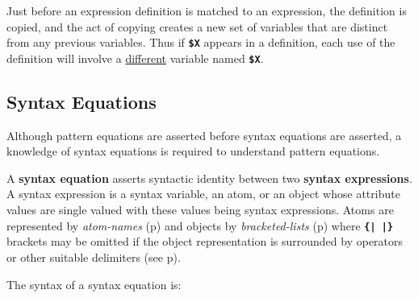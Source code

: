 \documentclass[12pt]{article}
\newcommand{\TT}[1]{{\tt \bfseries #1}}
\newcommand{\key}[1]{{\rm \bfseries #1}}
\newcommand{\pagref}[1]{p\pageref{#1}}
\begin{document}
Just before an expression definition is matched to an expression, the
definition is copied, and the act of copying 
creates a new set of variables that are distinct from any
previous variables.  Thus if \TT{\$X} appears in a definition, each
use of the definition will involve a \underline{different}
variable named \TT{\$X}.

\subsection{Syntax Equations}
\label{SYNTAX-EQUATIONS}

Although pattern equations are asserted before syntax equations are asserted,
a knowledge of syntax equations is required to understand pattern
equations.

A \key{syntax equation} asserts syntactic identity between two
\key{syntax expressions}.  A syntax expression is a syntax variable,
an atom, or an object whose attribute values are single valued with
these values being syntax expressions.
Atoms are represented by {\em atom-names} (\pagref{ATOM-NAME})
and objects by {\em bracketed-lists} (\pagref{BRACKETED-LIST})
where \TT{\{|~|\}} brackets may be omitted if the object representation
is surrounded by operators or other suitable delimiters (see \pagref{TBD}).

The syntax of a syntax equation is:
\end{document}
